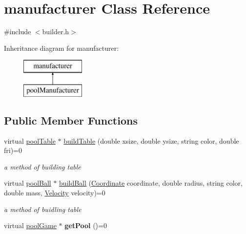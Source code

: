 \hypertarget{classmanufacturer}{}\section{manufacturer Class Reference}
\label{classmanufacturer}


{\ttfamily \#include $<$builder.\+h$>$}

Inheritance diagram for manufacturer\+:\begin{figure}[H]
\begin{center}
\leavevmode
\includegraphics[height=2.000000cm]{classmanufacturer}
\end{center}
\end{figure}
\subsection*{Public Member Functions}
\begin{DoxyCompactItemize}
\item 
\mbox{\label{classmanufacturer_a9b3efc9046298f34d56bfa66b89ef168}} 
virtual \mbox{\hyperlink{classpool_table}{pool\+Table}} $\ast$ \mbox{\hyperlink{classmanufacturer_a9b3efc9046298f34d56bfa66b89ef168}{build\+Table}} (double xsize, double ysize, string color, double fri)=0
\begin{DoxyCompactList}\small\item\em a method of building table \end{DoxyCompactList}\item 
\mbox{\label{classmanufacturer_a46701478dc4d2fa5c9bbe5257d19d26c}} 
virtual \mbox{\hyperlink{classpool_ball}{pool\+Ball}} $\ast$ \mbox{\hyperlink{classmanufacturer_a46701478dc4d2fa5c9bbe5257d19d26c}{build\+Ball}} (\mbox{\hyperlink{class_coordinate}{Coordinate}} coordinate, double radius, string color, double mass, \mbox{\hyperlink{class_velocity}{Velocity}} velocity)=0
\begin{DoxyCompactList}\small\item\em a method of buidling table \end{DoxyCompactList}\item 
\mbox{\label{classmanufacturer_a16f727b4433ba779beb2ce9b67a2087c}} 
virtual \mbox{\hyperlink{classpool_game}{pool\+Game}} $\ast$ {\bfseries get\+Pool} ()=0
\end{DoxyCompactItemize}
